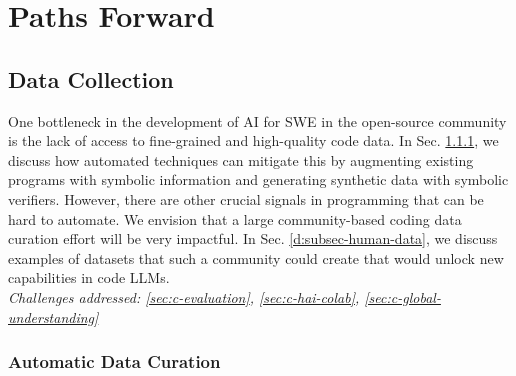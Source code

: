 \section{Paths Forward} \label{sec:paths}


\subsection{Data Collection} \label{sec:d-data}



\begin{tcolorbox}[colback=lightorange, boxrule=0pt, arc=5pt, outer arc=5pt]

One bottleneck in the development of AI for SWE in the open-source community is the lack of access to fine-grained and high-quality code data. In Sec. \ref{sec:d-automatic-data}, we discuss how automated techniques can mitigate this by augmenting existing programs with symbolic information and generating synthetic data with symbolic verifiers. However, there are other crucial signals in programming that can be hard to automate. We envision that a large community-based coding data curation effort will be very impactful. In Sec. \ref{d:subsec-human-data}, we discuss examples of datasets that such a community could create that would unlock new capabilities in code LLMs.
\newline \\
\textit{Challenges addressed: \ref{sec:c-evaluation}, \ref{sec:c-hai-colab}, \ref{sec:c-global-understanding}}
\end{tcolorbox}

\subsubsection{Automatic Data Curation} \label{sec:d-automatic-data}

